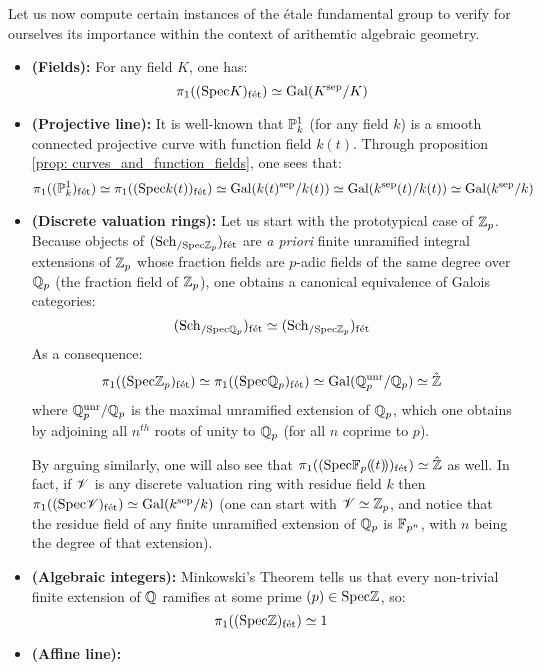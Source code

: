         Let us now compute certain instances of the \'etale fundamental group to verify for ourselves its importance within the context of arithemtic algebraic geometry.
        \begin{example} \label{example: etale_fundamental_groups}
            \noindent
            \begin{itemize}
                \item \textbf{(Fields):} For any field $K$, one has:
                    $$\pi_1((\Spec K)_{\fet}) \cong \Gal(K^{\sep}/K)$$
                \item \textbf{(Projective line):} It is well-known that $\P^1_k$ (for any field $k$) is a smooth connected projective curve with function field $k(t)$. Through proposition \ref{prop: curves_and_function_fields}, one sees that:
                    $$\pi_1((\P^1_k)_{\fet}) \cong \pi_1((\Spec k(t))_{\fet}) \cong \Gal(k(t)^{\sep}/k(t)) \cong \Gal(k^{\sep}(t)/k(t)) \cong \Gal(k^{\sep}/k)$$
                \item \textbf{(Discrete valuation rings):} Let us start with the prototypical case of $\Z_p$. Because objects of $(\Sch_{/\Spec \Z_p})_{\fet}$ are \textit{a priori} finite unramified integral extensions of $\Z_p$ whose fraction fields are $p$-adic fields of the same degree over $\Q_p$ (the fraction field of $\Z_p$), one obtains a canonical equivalence of Galois categories:
                    $$(\Sch_{/\Spec \Q_p})_{\fet} \cong (\Sch_{/\Spec \Z_p})_{\fet}$$
                As a consequence:
                    $$\pi_1((\Spec \Z_p)_{\fet}) \cong \pi_1((\Spec \Q_p)_{\fet}) \cong \Gal(\Q_p^{\unr}/\Q_p) \cong \hat{\Z}$$
                where $\Q_p^{\unr}/\Q_p$ is the maximal unramified extension of $\Q_p$, which one obtains by adjoining all $n^{th}$ roots of unity to $\Q_p$ (for all $n$ coprime to $p$).
                
                By arguing similarly, one will also see that $\pi_1((\Spec \F_p(\!(t)\!))_{\fet}) \cong \hat{\Z}$ as well. In fact, if $\scrV$ is any discrete valuation ring with residue field $k$ then $\pi_1((\Spec \scrV)_{\fet}) \cong \Gal(k^{\sep}/k)$ (one can start with $\scrV \cong \Z_p$, and notice that the residue field of any finite unramified extension of $\Q_p$ is $\F_{p^n}$, with $n$ being the degree of that extension).
                \item \textbf{(Algebraic integers):} Minkowski's Theorem tells us that every non-trivial finite extension of $\Q$ ramifies at some prime $(p) \in \Spec \Z$, so:
                    $$\pi_1((\Spec \Z)_{\fet}) \cong 1$$
                \item \textbf{(Affine line):} 
            \end{itemize}
        \end{example}
    
